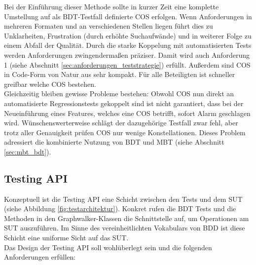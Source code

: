 Bei der Einführung dieser Methode sollte in kurzer Zeit eine komplette Umstellung auf als \Gls{BDT}-Testfall definierte \Gls{COS} erfolgen. Wenn Anforderungen in mehreren Formaten und an verschiedenen Stellen liegen führt dies zu Unklarheiten, Frustration (durch erhöhte Suchaufwände) und in weiterer Folge zu einem Abfall der Qualität. Durch die starke Koppelung mit automatisierten Tests werden Anforderungen zwingendermaßen präziser. Damit wird auch Anforderung 1 (siehe Abschnitt \ref{sec:anforderungen_teststrategie}) erfüllt. Außerdem sind \Gls{COS} in Code-Form von Natur aus sehr kompakt. Für alle Beteiligten ist schneller greifbar welche \Gls{COS} bestehen.\\
Gleichzeitig bleiben gewisse Probleme bestehen: Obwohl \Gls{COS} nun direkt an automatisierte Regressionstests gekoppelt sind ist nicht garantiert, dass bei der Neueinführung eines Features, welches eine \Gls{COS} betrifft, sofort Alarm geschlagen wird. Wünschenswerterweise schlägt der dazugehörige Testfall zwar fehl, aber trotz aller Genauigkeit prüfen \Gls{COS} nur wenige Konstellationen. Dieses Problem adressiert die kombinierte Nutzung von \Gls{BDT} und \Gls{MBT} (siehe Abschnitt \ref{sec:mbt_bdt}).

\subsection{Testing API}
\label{sec:testing_api}

Konzeptuell ist die Testing API eine Schicht zwischen den Tests und dem \Gls{SUT} (siehe Abbildung \ref{fig:testarchitektur}). Konkret rufen die \Gls{BDT} Tests und die Methoden in den Graphwalker-Klassen die Schnittstelle auf, um Operationen am \Gls{SUT} auszuführen. Im Sinne des vereinheitlichten Vokabulars von \Gls{BDD} ist diese Schicht eine uniforme Sicht auf das \Gls{SUT}.\\
Das Design der Testing API soll wohlüberlegt sein und die folgenden Anforderungen erfüllen:

